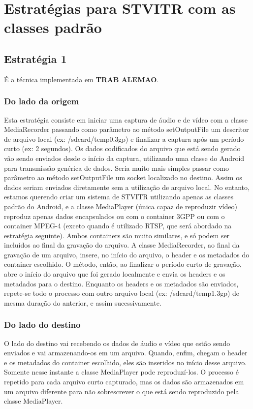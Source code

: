 \documentclass{acm_proc_article-sp}
\newcommand{\todo}[1]{\textcolor[rgb]{1.00,0.00,0.00}{\bf \uppercase{#1}}}
\begin{document}
\section{Estratégias para STVITR com as classes padrão}

\subsection{Estratégia 1}
É a técnica implementada em \todo{trab alemao}.

\subsubsection{Do lado da origem}

Esta estratégia consiste em iniciar uma captura de áudio e de vídeo com a classe MediaRecorder passando como parâmetro ao método setOutputFile um descritor de arquivo local (ex: /sdcard/temp0.3gp) e finalizar a captura após um período curto (ex: 2 segundos). Os dados codificados do arquivo que está sendo gerado vão sendo enviados desde o início da captura, utilizando uma classe do Android para transmissão genérica de dados. Seria muito mais simples passar como parâmetro ao método setOutputFile um socket localizado no destino. Assim os dados seriam enviados diretamente sem a utilização de arquivo local. No entanto, estamos querendo criar um sistema de STVITR utilizando apenas as classes padrão do Android, e a classe MediaPlayer (única capaz de reproduzir vídeo) reproduz apenas dados encapsulados ou com o container 3GPP ou com o container MPEG-4 (exceto quando é utilizado RTSP, que será abordado na estratégia seguinte). Ambos containers são muito similares, e só podem ser incluídos ao final da gravação do arquivo. A classe MediaRecorder, ao final da gravação de um arquivo, insere, no início do arquivo, o header e os metadados do container escolhido. O método, então, ao finalizar o período curto de gravação, abre o início do arquivo que foi gerado localmente e envia os headers e os metadados para o destino. Enquanto os headers e os metadados são enviados, repete-se todo o processo com outro arquivo local (ex: /sdcard/temp1.3gp) de mesma duração do anterior, e assim sucessivamente.

\subsubsection{Do lado do destino}

O lado do destino vai recebendo os dados de áudio e vídeo que estão sendo enviados e vai armazenando-os em um arquivo. Quando, enfim, chegam o header e os metadados do container escolhido, eles são inseridos no início desse arquivo. Somente nesse instante a classe MediaPlayer pode reproduzí-los. O processo é repetido para cada arquivo curto capturado, mas os dados são armazenados em um arquivo diferente para não sobrescrever o que está sendo reproduzido pela classe MediaPlayer.
\end{document}
